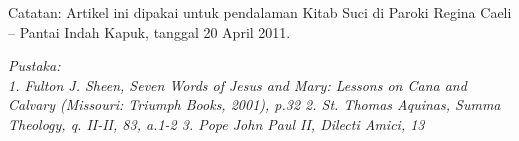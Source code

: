Catatan: Artikel ini dipakai untuk pendalaman Kitab Suci di Paroki Regina Caeli
– Pantai Indah Kapuk, tanggal 20 April 2011.

\textit{Pustaka:\\
   1. Fulton J. Sheen, Seven Words of Jesus and Mary: Lessons on Cana and Calvary (Missouri: Triumph Books, 2001), p.32 
   2. St. Thomas Aquinas, Summa Theology, q. II-II, 83, a.1-2 
   3. Pope John Paul II, Dilecti Amici, 13 
}
